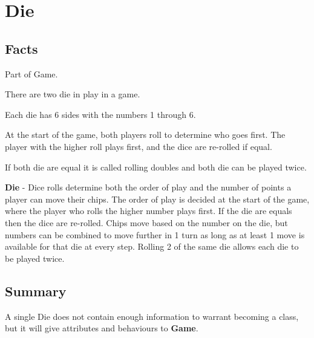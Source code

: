 \section{Die}

\subsection{Facts}

\begin{dashed}
    \item Part of Game.
    \item There are two die in play in a game.
    \item Each die has 6 sides with the numbers 1 through 6.
    \item At the start of the game, both players roll to determine who goes first.
    The player with the higher roll plays first, and the dice are re-rolled if equal.
    \item If both die are equal it is called rolling doubles and both die can be played twice.
\end{dashed}

\noindent
\newline\textbf{Die} - Dice rolls determine both the order of play and the
number of points a player can move their chips. The order of play is decided
at the start of the game, where the player who rolls the higher number plays first.
If the die are equals then the dice are re-rolled. Chips move based on the number on the die,
but numbers can be combined to move further in 1 turn as long as at least 1 move is available
for that die at every step. Rolling 2 of the same die allows each die to be played twice.

\subsection{Summary}
A single Die does not contain enough information to warrant becoming a class, but it will give attributes and behaviours to \textbf{Game}.

